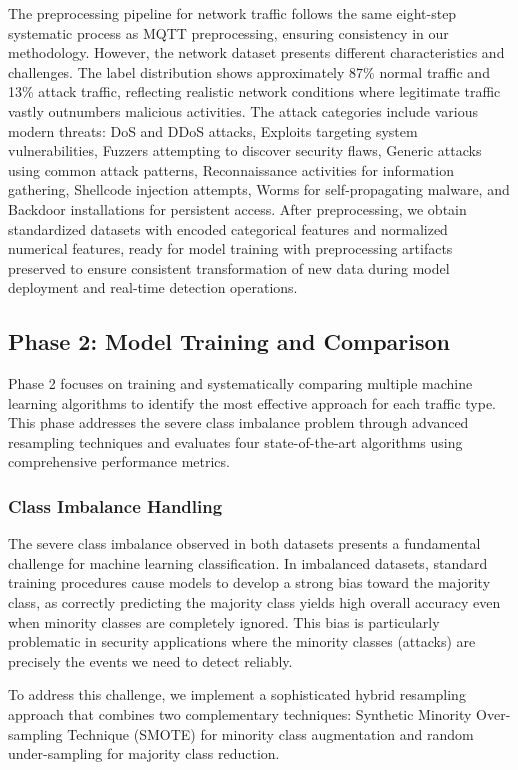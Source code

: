 \documentclass[conference]{IEEEtran}
\begin{document}
The preprocessing pipeline for network traffic follows the same eight-step systematic process as MQTT preprocessing, ensuring consistency in our methodology. However, the network dataset presents different characteristics and challenges. The label distribution shows approximately 87\% normal traffic and 13\% attack traffic, reflecting realistic network conditions where legitimate traffic vastly outnumbers malicious activities. The attack categories include various modern threats: DoS and DDoS attacks, Exploits targeting system vulnerabilities, Fuzzers attempting to discover security flaws, Generic attacks using common attack patterns, Reconnaissance activities for information gathering, Shellcode injection attempts, Worms for self-propagating malware, and Backdoor installations for persistent access. After preprocessing, we obtain standardized datasets with encoded categorical features and normalized numerical features, ready for model training with preprocessing artifacts preserved to ensure consistent transformation of new data during model deployment and real-time detection operations.

\subsection{Phase 2: Model Training and Comparison}

Phase 2 focuses on training and systematically comparing multiple machine learning algorithms to identify the most effective approach for each traffic type. This phase addresses the severe class imbalance problem through advanced resampling techniques and evaluates four state-of-the-art algorithms using comprehensive performance metrics.

\subsubsection{Class Imbalance Handling}

The severe class imbalance observed in both datasets presents a fundamental challenge for machine learning classification. In imbalanced datasets, standard training procedures cause models to develop a strong bias toward the majority class, as correctly predicting the majority class yields high overall accuracy even when minority classes are completely ignored. This bias is particularly problematic in security applications where the minority classes (attacks) are precisely the events we need to detect reliably.

To address this challenge, we implement a sophisticated hybrid resampling approach that combines two complementary techniques: Synthetic Minority Over-sampling Technique (SMOTE) for minority class augmentation and random under-sampling for majority class reduction.
\end{document}
